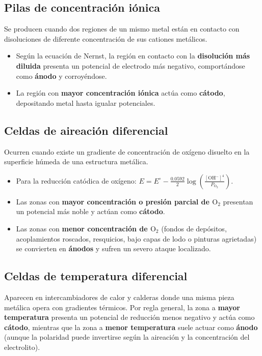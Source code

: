\subsection{Pilas de concentración iónica}
Se producen cuando dos regiones de un mismo metal están en contacto con disoluciones de diferente concentración de sus cationes metálicos.
\begin{itemize}
    \item Según la ecuación de Nernst, la región en contacto con la \textbf{disolución más diluida} presenta un potencial de electrodo más negativo, comportándose como \textbf{ánodo} y corroyéndose.
    \item La región con \textbf{mayor concentración iónica} actúa como \textbf{cátodo}, depositando metal hasta igualar potenciales.
\end{itemize}

\subsection{Celdas de aireación diferencial}
Ocurren cuando existe un gradiente de concentración de oxígeno disuelto en la superficie húmeda de una estructura metálica.
\begin{itemize}
    \item Para la reducción catódica de oxígeno: $E = E^\circ - \frac{0.0592}{2}\log \left(\frac{[\text{OH}^-]^4}{P_{\text{O}_2}}\right)$.
    \item Las zonas con \textbf{mayor concentración o presión parcial de $\text{O}_2$} presentan un potencial más noble y actúan como \textbf{cátodo}.
    \item Las zonas con \textbf{menor concentración de $\text{O}_2$} (fondos de depósitos, acoplamientos roscados, resquicios, bajo capas de lodo o pinturas agrietadas) se convierten en \textbf{ánodos} y sufren un severo ataque localizado.
\end{itemize}

\subsection{Celdas de temperatura diferencial}
Aparecen en intercambiadores de calor y calderas donde una misma pieza metálica opera con gradientes térmicos. Por regla general, la zona a \textbf{mayor temperatura} presenta un potencial de reducción menos negativo y actúa como \textbf{cátodo}, mientras que la zona a \textbf{menor temperatura} suele actuar como \textbf{ánodo} (aunque la polaridad puede invertirse según la aireación y la concentración del electrolito).

